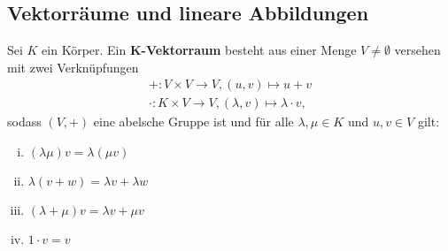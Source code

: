 \subsection{Vektorräume und lineare Abbildungen}
\begin{definition}[Vektorraum]
	\label{def:I.5.1}
	Sei $K$ ein Körper.
	Ein $\bm{K}$\textbf{-Vektorraum} besteht aus einer Menge $V \neq \emptyset$ versehen mit zwei Verknüpfungen 
	\begin{align*}
		+\colon V \times V \rightarrow V, (u,v) \mapsto u+v \\
		\cdot \colon K \times V \rightarrow V, (\lambda,v) \mapsto \lambda \cdot v,
	\end{align*}
	sodass $(V,+)$ eine abelsche Gruppe ist und für alle $\lambda, \mu \in K$ und $u,v \in V$ gilt:
	\begin{enumerate}[(i)]
		\item $(\lambda \mu) v = \lambda (\mu v)$
		\item $\lambda(v+w) = \lambda v + \lambda w$
		\item $(\lambda + \mu) v = \lambda v + \mu v$
		\item $1 \cdot v = v$
	\end{enumerate}
\end{definition}

